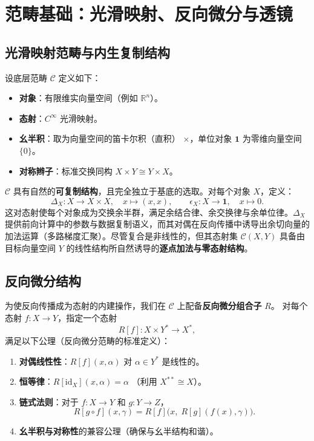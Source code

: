 \documentclass{ctexart}
\begin{document}
\section{范畴基础：光滑映射、反向微分与透镜}

\subsection{光滑映射范畴与内生复制结构}

设底层范畴 $\mathcal{C}$ 定义如下：
\begin{itemize}
    \item \textbf{对象}：有限维实向量空间（例如 $\mathbb{R}^n$）。
    \item \textbf{态射}：$C^\infty$ 光滑映射。
    \item \textbf{幺半积}：取为向量空间的笛卡尔积（直积） $\times$，单位对象 $\mathbf{1}$ 为零维向量空间 $\{0\}$。
    \item \textbf{对称辫子}：标准交换同构 $X \times Y \cong Y \times X$。
\end{itemize}

$\mathcal{C}$ 具有自然的\textbf{可复制结构}，且完全独立于基底的选取。对每个对象 $X$，定义：
\[
\Delta_X : X \to X \times X, \quad x \mapsto (x, x),
\qquad
\epsilon_X : X \to \mathbf{1}, \quad x \mapsto 0 .
\]
这对态射使每个对象成为交换余半群，满足余结合律、余交换律与余单位律。$\Delta_X$ 提供前向计算中的参数与数据复制语义，而其对偶在反向传播中诱导出余切向量的加法运算（多路梯度汇聚）。尽管复合是非线性的，但其态射集 $\mathcal{C}(X, Y)$ 具备由目标向量空间 $Y$ 的线性结构所自然诱导的\textbf{逐点加法与零态射结构}。

\subsection{反向微分结构}

为使反向传播成为态射的内建操作，我们在 $\mathcal{C}$ 上配备\textbf{反向微分组合子} $R$。  
对每个态射 $f: X \to Y$，指定一个态射
\[
R[f] : X \times Y^* \longrightarrow X^*,
\]
满足以下公理（反向微分范畴的标准定义）：
\begin{enumerate}
    \item \textbf{对偶线性性}：$R[f](x, \alpha)$ 对 $\alpha\in Y^*$ 是线性的。
    \item \textbf{恒等律}：$R[\mathrm{id}_X](x, \alpha) = \alpha$ （利用 $X^{**}\cong X$）。
    \item \textbf{链式法则}：对于 $f: X \to Y$ 和 $g: Y \to Z$，
    \[
    R[g \circ f](x, \gamma) = R[f]\big(x,\; R[g](f(x), \gamma)\big).
    \]
    \item \textbf{幺半积与对称性}的兼容公理（确保与幺半结构和谐）。
\end{enumerate}
\end{document}
